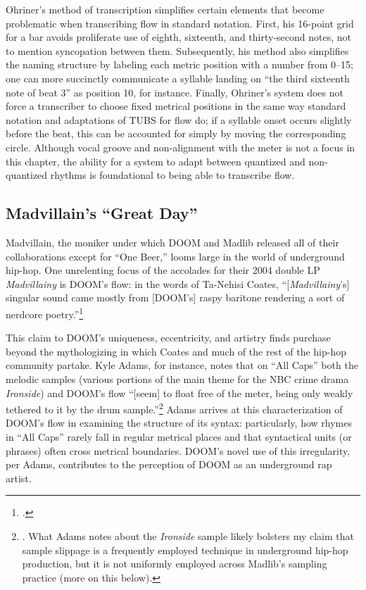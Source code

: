Ohriner's method of transcription simplifies certain elements that become problematic
when transcribing flow in standard notation. First, his 16-point grid for a bar avoids
proliferate use of eighth, sixteenth, and thirty-second notes, not to mention syncopation
between them. Subsequently, his method also simplifies the naming structure by labeling 
each metric position with a number from 0--15; one can more succinctly communicate a 
syllable landing on ``the third sixteenth note of beat 3'' as position 10, for instance. 
Finally, Ohriner's system does not force a transcriber to choose fixed metrical positions
in the same way standard notation and adaptations of TUBS for flow do; if a syllable onset
occurs slightly before the beat, this can be accounted for simply by moving the corresponding
circle. Although vocal groove and non-alignment with the meter is not a focus in this chapter,
the ability for a system to adapt between quantized and non-quantized rhythms is foundational
to being able to transcribe flow.

\subsection*{\centering Madvillain's ``Great Day''}

Madvillain, the moniker under which DOOM and Madlib released all of their collaborations
except for ``One Beer,'' looms large in the world of underground hip-hop. One unrelenting 
focus of the accolades for  their 2004 double LP \textit{Madvillainy} is DOOM's flow: in 
the words of Ta-Nehisi Coates, ``[\textit{Madvillainy}'s] singular sound came mostly from
[DOOM's] raspy baritone rendering a sort of nerdcore poetry.''\footnote{
    \cite{ta-nehisicoatesMaskDoomNonconformist2009}.}

This claim to DOOM's uniqueness, eccentricity, and artistry finds purchase beyond the 
mythologizing in which Coates and much of the rest of the hip-hop community partake. 
Kyle Adams, for instance, notes that on ``All Caps'' both the melodic samples (various 
portions of the main theme for the NBC crime drama \textit{Ironside}) and DOOM's flow 
``[seem] to float free of the meter, being only weakly tethered to
it by the drum sample.''\footnote{
    \cite{kyleadamsMetricalTechniquesFlow2009}. What Adams notes about the 
    \textit{Ironside} sample likely bolsters my claim that sample slippage is a 
    frequently employed technique in underground hip-hop production, but it is not 
    uniformly employed across Madlib's sampling practice (more on this below).}
Adams arrives at this characterization of DOOM's flow in examining the structure of 
its syntax: particularly, how rhymes in ``All Caps'' rarely fall in regular metrical 
places and that syntactical units (or phrases) often cross metrical boundaries. DOOM's
novel use of this irregularity, per Adams, contributes to the perception of DOOM as an
underground rap artist.

